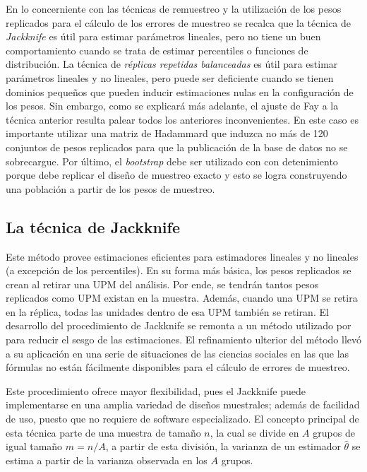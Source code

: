 \documentclass[
  12pt,
  spanish,
]{book}
\begin{document}
En lo concerniente con las técnicas de remuestreo y la utilización de los pesos replicados para el cálculo de los errores de muestreo se recalca que la técnica de \emph{Jackknife} es útil para estimar parámetros lineales, pero no tiene un buen comportamiento cuando se trata de estimar percentiles o funciones de distribución. La técnica de \emph{réplicas repetidas balanceadas} es útil para estimar parámetros lineales y no lineales, pero puede ser deficiente cuando se tienen dominios pequeños que pueden inducir estimaciones nulas en la configuración de los pesos. Sin embargo, como se explicará más adelante, el ajuste de Fay a la técnica anterior resulta palear todos los anteriores inconvenientes. En este caso es importante utilizar una matriz de Hadammard que induzca no más de 120 conjuntos de pesos replicados para que la publicación de la base de datos no se sobrecargue. Por último, el \emph{bootstrap} debe ser utilizado con con detenimiento porque debe replicar el diseño de muestreo exacto y esto se logra construyendo una población a partir de los pesos de muestreo.

\hypertarget{la-tuxe9cnica-de-jackknife}{%
\subsection{La técnica de Jackknife}\label{la-tuxe9cnica-de-jackknife}}

Este método provee estimaciones eficientes para estimadores lineales y no lineales (a excepción de los percentiles). En su forma más básica, los pesos replicados se crean al retirar una UPM del análisis. Por ende, se tendrán tantos pesos replicados como UPM existan en la muestra. Además, cuando una UPM se retira en la réplica, todas las unidades dentro de esa UPM también se retiran. El desarrollo del procedimiento de Jackknife se remonta a un método utilizado por \citet{Quenouille} para reducir el sesgo de las estimaciones. El refinamiento ulterior del método \citep{mosteller1968data} llevó a su aplicación en una serie de situaciones de las ciencias sociales en las que las fórmulas no están fácilmente disponibles para el cálculo de errores de muestreo.

Este procedimiento ofrece mayor flexibilidad, pues el Jackknife puede implementarse en una amplia variedad de diseños muestrales; además de facilidad de uso, puesto que no requiere de software especializado. El concepto principal de esta técnica parte de una muestra de tamaño \(n\), la cual se divide en \(A\) grupos de igual tamaño \(m=n/A\), a partir de esta división, la varianza de un estimador \(\hat{\theta}\) se estima a partir de la varianza observada en los \(A\) grupos.
\end{document}
